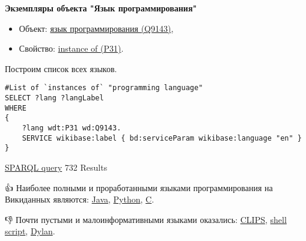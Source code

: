 \textbf{Экземпляры объекта "Язык программирования"}

\begin{itemize}
    \item Объект: \href{https://www.wikidata.org/wiki/Q9143}{язык программирования (Q9143)},
    \item Свойство: \href{https://www.wikidata.org/wiki/Property:P31}{instance of (P31)}.
\end{itemize}

Построим список всех языков.

\begin{lstlisting}[language=SPARQL]
#List of `instances of` "programming language" 
SELECT ?lang ?langLabel
WHERE
{
    ?lang wdt:P31 wd:Q9143.
    SERVICE wikibase:label { bd:serviceParam wikibase:language "en" }
}
\end{lstlisting}

\href{https://query.wikidata.org/#%23added%202016-10%0A%23List%20of%20%60instances%20of%60%20%22programming%20language%22%20%0ASELECT%20%3Flang%20%3FlangLabel%0AWHERE%0A%7B%0A%20%20%20%20%3Flang%20wdt%3AP31%20wd%3AQ9143.%0A%20%20%20%20SERVICE%20wikibase%3Alabel%20%7B%20bd%3AserviceParam%20wikibase%3Alanguage%20%22en%22%20%7D%0A%7D}{SPARQL query} 732 Results

👍 Наиболее полными и проработанными языками программирования на Викиданных являются:
\href{https://www.wikidata.org/wiki/Q251}{Java}, 
\href{https://www.wikidata.org/wiki/Q28865}{Python},
\href{https://www.wikidata.org/wiki/Q15777}{C}.

👎 Почти пустыми и малоинформативными языками оказались:
\href{https://www.wikidata.org/wiki/Q165372}{CLIPS},
\href{https://www.wikidata.org/wiki/Q959549}{shell script},
\href{https://www.wikidata.org/wiki/Q1268744}{Dylan}.